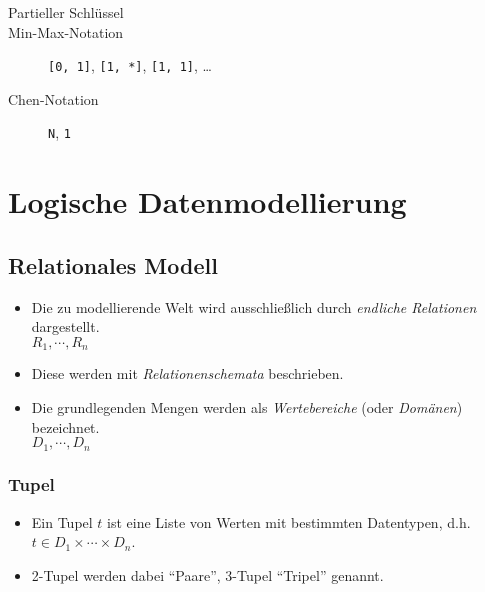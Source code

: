 \begin{description}
				\item[Partieller Schlüssel]
				\item[Min-Max-Notation] \texttt{[0, 1]}, \texttt{[1, *]}, \texttt{[1, 1]}, \dots
				\item[Chen-Notation] \texttt{N}, \texttt{1}
			\end{description}

\chapter{Logische Datenmodellierung} %
\label{c:logicmodel}

\section{Relationales Modell} %
	\begin{itemize}
		\item Die zu modellierende Welt wird ausschließlich durch \textit{endliche Relationen} dargestellt. \\ \( R _ 1, \cdots, R _ n \)
		\item Diese werden mit \textit{Relationenschemata} beschrieben.
		\item Die grundlegenden Mengen werden als \textit{Wertebereiche} (oder \textit{Domänen}) bezeichnet. \\ \( D _ 1, \cdots, D _ n \)
	\end{itemize}

	\subsection{Tupel} %
		\begin{itemize}
			\item Ein Tupel \(t\) ist eine Liste von Werten mit bestimmten Datentypen, d.h. \( t \in D _ 1 \times \cdots \times D _ n \).
			\item 2-Tupel werden dabei \enquote{Paare}, 3-Tupel \enquote{Tripel} genannt.
		\end{itemize}

